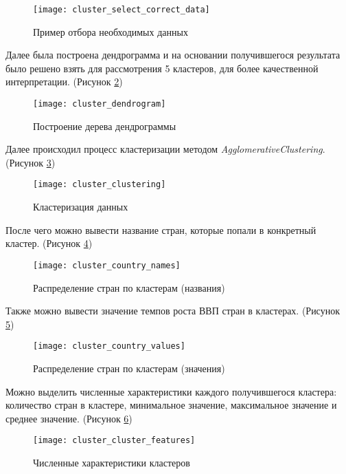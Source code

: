 \begin{figure}[h]
	\centering \texttt{[image: cluster\_select\_correct\_data]}
	\caption{Пример отбора необходимых данных}
	\label{fig:cluster_select_correct_data}
\end{figure}

Далее была построена дендрограмма и на основании получившегося результата было решено взять для рассмотрения 5 кластеров, для более качественной интерпретации. (Рисунок \ref{fig:cluster_dendrogram})

\begin{figure}[h]
	\centering \texttt{[image: cluster\_dendrogram]}
	\caption{Построение дерева дендрограммы}
	\label{fig:cluster_dendrogram}
\end{figure}

\newpage

Далее происходил процесс кластеризации методом \textit{AgglomerativeClustering}. (Рисунок \ref{fig:cluster_clustering})

\begin{figure}[h]
	\centering \texttt{[image: cluster\_clustering]}
	\caption{Кластеризация данных}
	\label{fig:cluster_clustering}
\end{figure}

После чего можно вывести название стран, которые попали в конкретный кластер. (Рисунок \ref{fig:cluster_country_names})

\begin{figure}[h]
	\centering \texttt{[image: cluster\_country\_names]}
	\caption{Распределение стран по кластерам (названия)}
	\label{fig:cluster_country_names}
\end{figure}

Также можно вывести значение темпов роста ВВП стран в кластерах. (Рисунок \ref{fig:cluster_country_values})

\begin{figure}[h]
	\centering \texttt{[image: cluster\_country\_values]}
	\caption{Распределение стран по кластерам (значения)}
	\label{fig:cluster_country_values}
\end{figure}

\newpage

Можно выделить численные характеристики каждого получившегося кластера: количество стран в кластере, минимальное значение, максимальное значение и среднее значение. (Рисунок \ref{fig:cluster_cluster_features})

\begin{figure}[h]
	\centering \texttt{[image: cluster\_cluster\_features]}
	\caption{Численные характеристики кластеров}
	\label{fig:cluster_cluster_features}
\end{figure}

